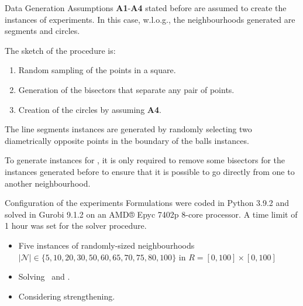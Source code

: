 \documentclass[slidestop,usepdftitle=false,10pt]{beamer}
\newcommand{\KMPHN}{{\sf{H-KMPHN}}}
\newcommand{\KMPN}{{\sf{H-KMPN}\xspace }}
\begin{document}
	\begin{frame}{Data Generation}
		Assumptions \textbf{A1}-\textbf{A4} stated before are assumed to create the instances of experiments. In this case, w.l.o.g., the neighbourhoods generated are segments and circles. 
		
		The sketch of the procedure is: 
		
		\begin{enumerate}
			\item Random sampling of the points in a square.
			\item Generation of the bisectors that separate any pair of points.
			\item Creation of the circles by assuming \textbf{A4}.
		\end{enumerate}
	
		The line segments instances are generated by randomly selecting two diametrically opposite points in the boundary of the balls instances.
		
		\medskip
		
		To generate instances for \KMPN, it is only required to remove some bisectors for the instances generated before to ensure that it is possible to go directly from one to another neighbourhood.
		
	\end{frame}

	\begin{frame}{Configuration of the experiments}
		Formulations were coded in Python 3.9.2 and solved in Gurobi 9.1.2 on an AMD® Epyc 7402p 8-core processor. A time limit of 1 hour was set for the solver procedure.
		
		\begin{itemize}
			\item Five instances of randomly-sized neighbourhoods $|\mathcal N|\in\{5, 10, 20, 30, 50, 60, 65, 70, 75, 80, 100\}$ in $R=[0,100]\times[0, 100]$
			\item Solving \KMPN \ and \KMPHN.
			\item Considering strengthening.
		\end{itemize}

	\end{frame}
\end{document}
